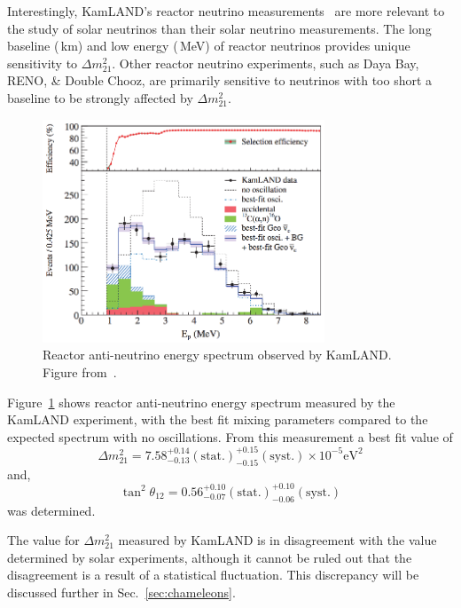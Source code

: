 Interestingly, KamLAND's reactor neutrino measurements~\cite{kamland_reactor} are
more relevant to the study of solar neutrinos than their solar neutrino measurements.
The long baseline (\,km) and low energy (\,MeV) of reactor neutrinos provides
unique sensitivity to $\Delta m^{2}_{21}$.
Other reactor neutrino experiments, such as Daya Bay, RENO, \& Double Chooz,
are primarily sensitive to neutrinos with too short a baseline to be strongly
affected by $\Delta m^{2}_{21}$.

\begin{figure}[htbp]
  \centering
  \includegraphics[width=0.75\textwidth]{kamland_reactor_spectrum}
  \caption[Kamland Reactor Spectrum]{Reactor anti-neutrino energy spectrum observed by KamLAND.
                                    Figure from~\cite{kamland_reactor}.}
  \label{fig:kamland_reactor}
\end{figure}

Figure~\ref{fig:kamland_reactor} shows reactor anti-neutrino energy spectrum measured
by the KamLAND experiment, with the best fit mixing parameters compared to the
expected spectrum with no oscillations.
From this measurement a best fit value of 
\begin{equation*}
    \Delta m^{2}_{21} = 7.58^{+0.14}_{-0.13}(\mathrm{stat.})^{+0.15}_{-0.15}(\mathrm{syst.}) \times 10^{-5}\text{eV}^{2}
\end{equation*}
and,
\begin{equation*}
\tan^{2} \theta_{12} = 0.56^{+0.10}_{-0.07}(\mathrm{stat.})^{+0.10}_{-0.06}(\mathrm{syst.})
\end{equation*}
was determined.

The value for $\Delta m^{2}_{21}$ measured by KamLAND is in disagreement with
the value determined by solar experiments, although it cannot be ruled out that
the disagreement is a result of a statistical fluctuation. This discrepancy
will be discussed further in Sec.~\ref{sec:chameleons}.
